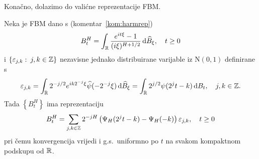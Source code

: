 \documentclass[main.tex]{subfiles}
\begin{document}
Konačno, dolazimo do valićne reprezentacije FBM.

\begin{teorem}
	Neka je FBM dano s (komentar~\ref{kom:harmrep})
	\begin{equation}
		B^H_t = \int_{\mathbb{R}} \frac{e^{it\xi}-1}{(i\xi)^{H+1/2}} \,\mathrm d \widehat{B}_\xi, \quad t \ge 0
	\end{equation}
	i
	\( \left\{ \varepsilon_{j,k} \, \colon \, j,k \in \mathbb{Z} \right\} \)
	nezavisne jednako distribuirane varijable iz \( \mathrm N(0,1) \) definirane s
	\begin{equation}\label{eq:defepsjk}
		\varepsilon_{j,k} =
		\int_{\mathbb{R}} 2^{-j/2}e^{ik2^{-j}\xi}\widehat{\psi}(-2^{-j}\xi)\,\mathrm d \widehat{B}_\xi =
		\int_{\mathbb{R}} 2^{j/2} \psi(2^jt-k) \,\mathrm d B_t, \quad j,k\in \mathbb{Z}.
	\end{equation}
	Tada \( \left\{ B^H_t  \right\} \) ima reprezentaciju
	\begin{equation}\label{eq:valfbmrep}
		B^H_t = \sum_{j,k \in \mathbb{Z}}
		2^{-jH} \left( \Psi_H(2^jt - k) - \Psi_H(-k)  \right) \varepsilon_{j,k}, \quad t \ge 0
	\end{equation}
	pri čemu konvergencija vrijedi i g.s.\ uniformno po \( t \) na svakom
	kompaktnom podskupu od \( \mathbb{R} \).
\end{teorem}
\end{document}
